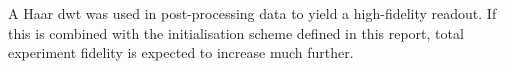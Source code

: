 A Haar \gls{dwt} was used in post-processing data to yield a high-fidelity readout. If this is combined with the initialisation scheme defined in this report, total experiment fidelity is expected to increase much further. 



